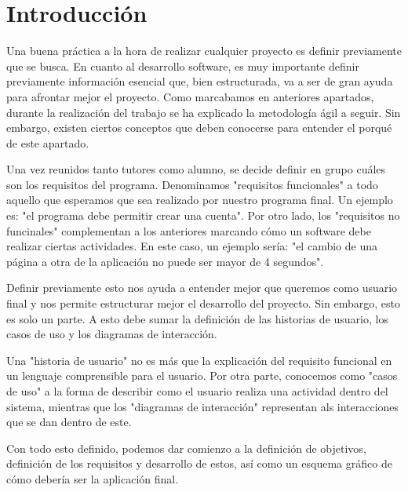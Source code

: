 
\section{Introducción}

	Una buena práctica a la hora de realizar cualquier proyecto es definir previamente que se busca. En cuanto al desarrollo software, es muy importante definir previamente información esencial que, bien estructurada, va a ser de gran ayuda para afrontar mejor el proyecto. Como marcabamos en anteriores apartados, durante la realización del trabajo se ha explicado la metodología ágil a seguir. Sin embargo, existen ciertos conceptos que deben conocerse para entender el porqué de este apartado.	
	
	Una vez reunidos tanto tutores como alumno, se decide definir en grupo cuáles son los requisitos del programa. Denominamos "requisitos funcionales" a todo aquello que esperamos que sea realizado por nuestro programa final. Un ejemplo es: "el programa debe permitir crear una cuenta". Por otro lado, los "requisitos no funcinales" complementan a los anteriores marcando cómo un software debe realizar ciertas actividades. En este caso, un ejemplo sería: "el cambio de una página a otra de la aplicación no puede ser mayor de 4 segundos".
	
	Definir previamente esto nos ayuda a entender mejor que queremos como usuario final y nos permite estructurar mejor el desarrollo del proyecto. Sin embargo, esto es solo un parte. A esto debe sumar la definición de las historias de usuario, los casos de uso y los diagramas de interacción.
	
	Una "historia de usuario" no es más que la explicación del requisito funcional en un lenguaje comprensible para el usuario. Por otra parte, conocemos como "casos de uso" a la forma de describir como el usuario realiza una actividad dentro del sistema, mientras que los "diagramas de interacción" representan als interacciones que se dan dentro de este.
	
	Con todo esto definido, podemos dar comienzo a la definición de objetivos, definición de los requisitos y desarrollo de estos, así como un esquema gráfico de cómo debería ser la aplicación final.


